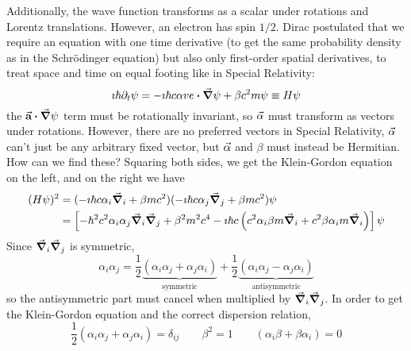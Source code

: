 \documentclass[a4paper,twoside,master.tex]{subfiles}
\begin{document}
Additionally, the wave function transforms as a scalar under rotations and Lorentz translations. However, an electron has spin $ 1/2 $. Dirac postulated that we require an equation with one time derivative (to get the same probability density as in the Schr\"odinger equation) but also only first-order spatial derivatives, to treat space and time on equal footing like in Special Relativity:
\begin{equation}
    \imath \hbar \partial_t \psi = - \imath \hbar c \alpha ve \vdot \grad{\psi} + \beta c^2 m \psi \equiv H \psi
\end{equation}
the $ \va{a} \vdot \grad{\psi} $ term must be rotationally invariant, so $ \va{\alpha} $ must transform as vectors under rotations. However, there are no preferred vectors in Special Relativity, $ \va{\alpha} $ can't just be any arbitrary fixed vector, but $ \va{\alpha} $ and $ \beta $ must instead be Hermitian. How can we find these? Squaring both sides, we get the Klein-Gordon equation on the left, and on the right we have
\begin{align}
    (H \psi)^2 &= (- \imath \hbar c \alpha_i \grad_i + \beta m c^2)(- \imath \hbar c \alpha_j \grad_j + \beta m c^2) \psi \\
               &= \left[- \hbar^2 c^2 \alpha_i \alpha_j \grad_i \grad_j + \beta^2 m^2 c^4 - \imath \hbar c \left( c^2 \alpha_i \beta m \grad_i + c^2 \beta \alpha_i m \grad_i \right)\right] \psi 
\end{align}
Since $ \grad_i \grad_j $ is symmetric,
\begin{equation}
    \alpha_i \alpha_j = \frac{1}{2} \underbrace{(\alpha_i \alpha_j + \alpha_j \alpha_i)}_{\text{symmetric}} + \frac{1}{2} \underbrace{(\alpha_i \alpha_j - \alpha_j \alpha_i)}_{\text{antisymmetric}}
\end{equation}
so the antisymmetric part must cancel when multiplied by $ \grad_i \grad_j $. In order to get the Klein-Gordon equation and the correct dispersion relation,
\begin{equation}
    \frac{1}{2} (\alpha_i \alpha_j + \alpha_j \alpha_i) = \delta_{ij} \qquad \beta^2 = 1 \qquad (\alpha_i \beta + \beta \alpha_i) = 0
\end{equation}
\end{document}
